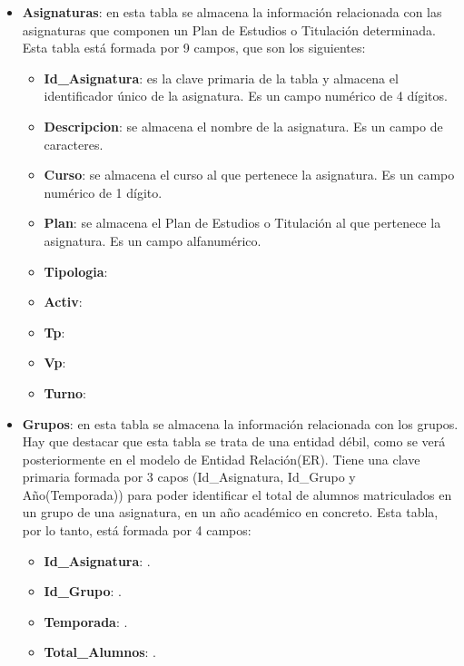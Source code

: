 \begin{itemize}
\item
\textbf{Asignaturas}: en esta tabla se almacena la información relacionada con las asignaturas que componen un Plan de Estudios o Titulación determinada. Esta tabla está formada por 9 campos, que son los siguientes:
\begin{itemize}
\item
\textbf{Id_Asignatura}: es la clave primaria de la tabla y almacena el identificador único de la asignatura. Es un campo numérico de 4 dígitos.
\item
\textbf{Descripcion}: se almacena el nombre de la asignatura. Es un campo de caracteres.
\item
\textbf{Curso}: se almacena el curso al que pertenece la asignatura. Es un campo numérico de 1 dígito.
\item
\textbf{Plan}: se almacena el Plan de Estudios o Titulación al que pertenece la asignatura. Es un campo alfanumérico.
\item
\textbf{Tipologia}:
\item
\textbf{Activ}:
\item
\textbf{Tp}:
\item
\textbf{Vp}:
\item
\textbf{Turno}:
\end{itemize}

\item
\textbf{Grupos}: en esta tabla se almacena la información relacionada con los grupos. Hay que destacar que esta tabla se trata de una entidad débil, como se verá posteriormente en el modelo de Entidad Relación(ER). Tiene una clave primaria formada por 3 capos (Id_Asignatura, Id_Grupo y Año(Temporada)) para poder identificar el total de alumnos matriculados en un grupo de una asignatura, en un año académico en concreto. Esta tabla, por lo tanto, está formada por 4 campos:
\begin{itemize}
\item
\textbf{Id_Asignatura}: .
\item
\textbf{Id_Grupo}: .
\item
\textbf{Temporada}: .
\item
\textbf{Total_Alumnos}: .
\end{itemize}



\end{itemize}
